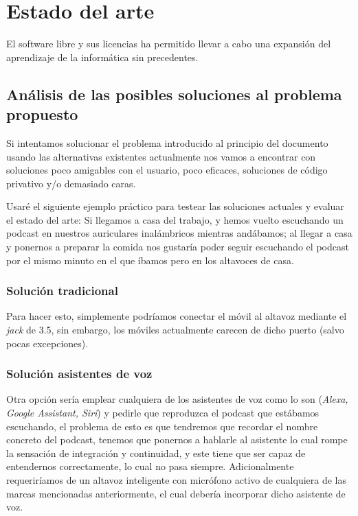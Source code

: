 \chapter{Estado del arte}

El software libre y sus licencias \cite{gplv3} ha permitido llevar a cabo una expansión del
aprendizaje de la informática sin precedentes.

\section{Análisis de las posibles soluciones al problema propuesto}

Si intentamos solucionar el problema introducido al principio del documento
usando las alternativas existentes actualmente nos vamos a encontrar con
soluciones poco amigables con el usuario, poco eficaces, soluciones de código
privativo y/o demasiado caras.

Usaré el siguiente ejemplo práctico para testear las soluciones actuales y
evaluar el estado del arte: Si llegamos a casa del trabajo, y hemos vuelto
escuchando un podcast en nuestros auriculares inalámbricos mientras andábamos;
al llegar a casa y ponernos a preparar la comida nos gustaría poder seguir
escuchando el podcast por el mismo minuto en el que íbamos pero en los altavoces
de casa. 

\subsection{Solución tradicional}
Para hacer esto, simplemente podríamos conectar el móvil al altavoz mediante el
\emph{jack} de 3.5, sin embargo, los móviles actualmente carecen de dicho puerto
(salvo pocas excepciones). 

\subsection{Solución asistentes de voz}
Otra opción sería emplear cualquiera de los asistentes de voz como lo son
(\emph{Alexa, Google Assistant, Siri}) y pedirle que reproduzca el podcast que
estábamos escuchando, el problema de esto es que tendremos que recordar el
nombre concreto del podcast, tenemos que ponernos a hablarle al asistente lo
cual rompe la sensación de integración y continuidad, y este tiene que ser capaz
de entendernos correctamente, lo cual no pasa siempre. Adicionalmente
requeriríamos de un altavoz inteligente con micrófono activo de cualquiera de las
marcas mencionadas anteriormente, el cual debería incorporar dicho asistente de
voz. 

